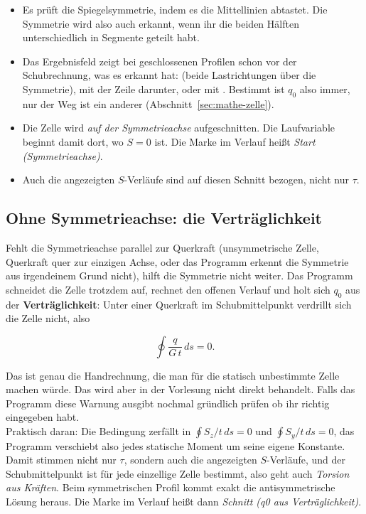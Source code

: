 \begin{itemize}
  \item Es prüft die Spiegelsymmetrie, indem es die Mittellinien abtastet. Die Symmetrie wird
        also auch erkannt, wenn ihr die beiden Hälften unterschiedlich in Segmente geteilt habt.
  \item Das Ergebnisfeld zeigt bei geschlossenen Profilen schon vor der Schubrechnung, was es
        erkannt hat:  (beide Lastrichtungen über die Symmetrie),
         mit der Zeile 
        darunter, oder  mit . Bestimmt ist $q_0$
        also immer, nur der Weg ist ein anderer (Abschnitt~\ref{sec:mathe-zelle}).
  \item Die Zelle wird \emph{auf der Symmetrieachse} aufgeschnitten. Die Laufvariable beginnt
        damit dort, wo $S = 0$ ist. Die Marke im Verlauf heißt \emph{Start (Symmetrieachse)}.
  \item Auch die angezeigten $S$-Verläufe sind auf diesen Schnitt bezogen, nicht nur $\tau$.
\end{itemize}

\subsection{Ohne Symmetrieachse: die Verträglichkeit}

Fehlt die Symmetrieachse parallel zur Querkraft (unsymmetrische Zelle, Querkraft quer zur
einzigen Achse, oder das Programm erkennt die Symmetrie aus irgendeinem Grund nicht), hilft
die Symmetrie nicht weiter. Das Programm schneidet die Zelle trotzdem auf, rechnet den offenen
Verlauf und holt sich $q_0$ aus der \textbf{Verträglichkeit}: Unter einer Querkraft im
Schubmittelpunkt verdrillt sich die Zelle nicht, also

\[
  \oint \frac{q}{G\,t}\,ds = 0 .
\]

Das ist genau die Handrechnung, die man für die statisch unbestimmte Zelle machen würde. Das wird aber in der Vorlesung nicht direkt behandelt.
Falls das Programm diese Warnung ausgibt nochmal gründlich prüfen ob ihr richtig eingegeben habt.\\
Praktisch daran: Die Bedingung zerfällt in $\oint S_z/t\,ds = 0$ und $\oint S_y/t\,ds = 0$, das
Programm verschiebt also jedes statische Moment um seine eigene Konstante. Damit stimmen nicht nur
$\tau$, sondern auch die angezeigten $S$-Verläufe, und der Schubmittelpunkt ist für jede einzellige
Zelle bestimmt, also geht auch \emph{Torsion aus Kräften}. Beim symmetrischen Profil kommt exakt die
antisymmetrische Lösung heraus. Die Marke im Verlauf heißt dann \emph{Schnitt (q0 aus
Verträglichkeit)}.

